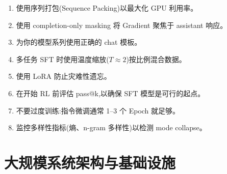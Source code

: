 \begin{keybox}
\begin{enumerate}
  \item 使用序列打包(Sequence Packing)以最大化 GPU 利用率。
  \item 使用 completion-only masking 将 Gradient 聚焦于 assistant 响应。
  \item 为你的模型系列使用正确的 chat 模板。
  \item 多任务 SFT 时使用温度缩放($T \approx 2$)按比例混合数据。
  \item 使用 LoRA 防止灾难性遗忘。
  \item 在开始 RL 前评估 pass@k,以确保 SFT 模型是可行的起点。
  \item 不要过度训练:指令微调通常 1--3 个 Epoch 就足够。
  \item 监控多样性指标(熵、n-gram 多样性)以检测 mode collapse。
\end{enumerate}
\end{keybox}

\chapter{大规模系统架构与基础设施}
\label{system-architecture-infrastructure-at-scale}

